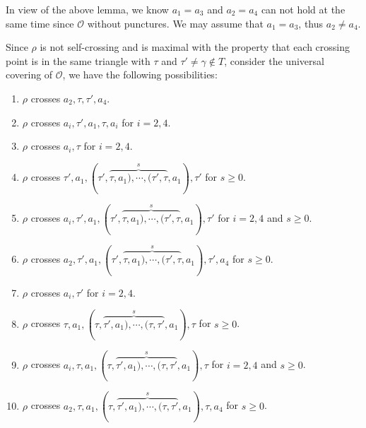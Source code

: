 \documentclass[10pt]{amsart}
\theoremstyle{theorems}
\begin{document}
\medskip

In view of the above lemma, we know $a_1=a_3$ and $a_2=a_4$ can not hold at the same time since $\mathcal O$ without punctures. We may assume that $a_1=a_3$, thus $a_2\neq a_4$.

\medskip

Since $\rho$ is not self-crossing and is maximal with the property that each crossing point is in the same triangle with $\tau$ and $\tau'\neq\gamma\notin T$, consider the universal covering of $\mathcal O$, we have the following possibilities:

\begin{enumerate}[$(1)$]

  \item $\rho$ crosses $a_2,\tau,\tau',a_4$.

  \item $\rho$ crosses $a_i,\tau',a_1,\tau,a_i$ for $i=2,4$.

  \item $\rho$ crosses $a_i,\tau$ for $i=2,4$.

  \item $\rho$ crosses $\tau',a_1,(\tau',\overset{s}{\overbrace{\tau,a_1),\cdots,(\tau',\tau}},a_1),\tau'$ for $s\geq 0$.

  \item $\rho$ crosses $a_i,\tau',a_1,(\tau',\overset{s}{\overbrace{\tau,a_1),\cdots,(\tau',\tau}},a_1),\tau'$ for $i=2,4$ and $s\geq 0$.

  \item $\rho$ crosses $a_2,\tau',a_1,(\tau',\overset{s}{\overbrace{\tau,a_1),\cdots,(\tau',\tau}},a_1),\tau',a_4$ for $s\geq 0$.

  \item $\rho$ crosses $a_i,\tau'$ for $i=2,4$.

  \item $\rho$ crosses $\tau,a_1,(\tau,\overset{s}{\overbrace{\tau',a_1),\cdots,(\tau,\tau'}},a_1),\tau$ for $s\geq 0$.

  \item $\rho$ crosses $a_i,\tau,a_1,(\tau,\overset{s}{\overbrace{\tau',a_1),\cdots,(\tau,\tau'}},a_1),\tau$ for $i=2,4$ and $s\geq 0$.

  \item $\rho$ crosses $a_2,\tau,a_1,(\tau,\overset{s}{\overbrace{\tau',a_1),\cdots,(\tau,\tau'}},a_1),\tau,a_4$ for $s\geq 0$.

\end{enumerate}
\end{document}
